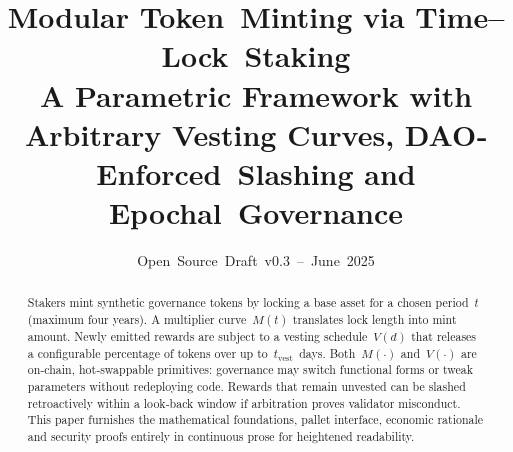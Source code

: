 \documentclass[11pt]{article}
\begin{document}
\title{Modular Token Minting via Time--Lock Staking\\ \large A Parametric Framework with Arbitrary Vesting Curves, DAO‐Enforced Slashing and Epochal Governance}
\author{Open Source Draft v0.3 -- June 2025}
\date{}
\maketitle

\begin{abstract}
Stakers mint synthetic governance tokens by locking a base asset for a chosen period~\(t\) (maximum four years). A multiplier curve~\(M(t)\) translates lock length into mint amount. Newly emitted rewards are subject to a vesting schedule~\(V(d)\) that releases a configurable percentage of tokens over up to~\(t_{\text{vest}}\)~days. Both~\(M(\cdot)\) and~\(V(\cdot)\) are on‑chain, hot‑swappable primitives: governance may switch functional forms or tweak parameters without redeploying code. Rewards that remain unvested can be slashed retroactively within a look‑back window if arbitration proves validator misconduct. This paper furnishes the mathematical foundations, pallet interface, economic rationale and security proofs entirely in continuous prose for heightened readability.
\end{abstract}

\tableofcontents
\newpage

\end{document}
